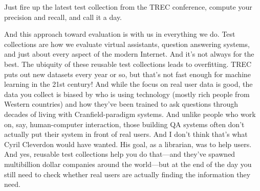 Just fire up the latest test collection from the TREC conference, compute your precision and recall, and call it a day.

And this approach toward evaluation is with us in everything we do.  Test collections are how we evaluate virtual assistants, question answering systems, and just about every aspect of the modern Internet.  And it’s not always for the best.  The ubiquity of these reusable test collections leads to overfitting.  TREC puts out new datasets every year or so, but that’s not fast enough for machine learning in the 21st century!  And while the focus on real user data is good, the data you collect is biased by who is using technology (mostly rich people from Western countries) and how they’ve been trained to ask questions through decades of living with Cranfield-paradigm systems.  And unlike people who work on, say, human-computer interaction, those building QA systems often don’t actually put their system in front of real users.  And I don’t think that’s what Cyril Cleverdon would have wanted.  His goal, as a librarian, was to help users.  And yes, reusable test collections help you do that—and they’ve spawned multibillion dollar companies around the world—but at the end of the day you still need to check whether real users are actually finding the information they need.

